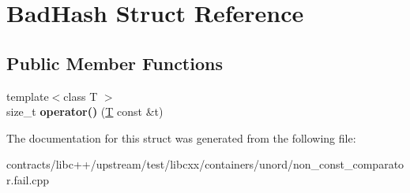 \hypertarget{struct_bad_hash}{}\section{Bad\+Hash Struct Reference}
\label{struct_bad_hash}
\subsection*{Public Member Functions}
\begin{DoxyCompactItemize}
\item 
\mbox{\label{struct_bad_hash_a34b4034f98da5b874a4e2511402f72e1}} 
{\footnotesize template$<$class T $>$ }\\size\+\_\+t {\bfseries operator()} (\mbox{\hyperlink{struct_t}{T}} const \&t)
\end{DoxyCompactItemize}


The documentation for this struct was generated from the following file\+:\begin{DoxyCompactItemize}
\item 
contracts/libc++/upstream/test/libcxx/containers/unord/non\+\_\+const\+\_\+comparator.\+fail.\+cpp\end{DoxyCompactItemize}

